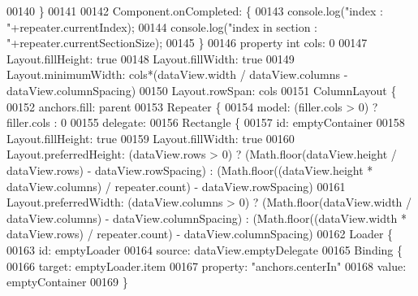 \begin{DoxyCode}
{00140 \textcolor{comment}{                \}}
00141 \textcolor{comment}{}
00142 \textcolor{comment}{                Component.onCompleted: \{}
00143 \textcolor{comment}{                    console.log("index : "+repeater.currentIndex);}
00144 \textcolor{comment}{                    console.log("index in section : "+repeater.currentSectionSize);}
00145 \textcolor{comment}{                \}}
00146 \textcolor{comment}{                property int cols: 0}
00147 \textcolor{comment}{                Layout.fillHeight: true}
00148 \textcolor{comment}{                Layout.fillWidth: true}
00149 \textcolor{comment}{                Layout.minimumWidth: cols*(dataView.width / dataView.columns  - dataView.columnSpacing)}
00150 \textcolor{comment}{                Layout.rowSpan: cols}
00151 \textcolor{comment}{                ColumnLayout \{}
00152 \textcolor{comment}{                    anchors.fill: parent}
00153 \textcolor{comment}{                    Repeater \{}
00154 \textcolor{comment}{                        model: (filler.cols > 0) ? filler.cols : 0}
00155 \textcolor{comment}{                        delegate:}
00156 \textcolor{comment}{                            Rectangle \{}
00157 \textcolor{comment}{                            id: emptyContainer}
00158 \textcolor{comment}{                            Layout.fillHeight: true}
00159 \textcolor{comment}{                            Layout.fillWidth: true}
00160 \textcolor{comment}{                            Layout.preferredHeight: (dataView.rows > 0) ? (Math.floor(dataView.height /
       dataView.rows) - dataView.rowSpacing) : (Math.floor((dataView.height * dataView.columns) / repeater.count) -
       dataView.rowSpacing)}
00161 \textcolor{comment}{                            Layout.preferredWidth: (dataView.columns > 0) ? (Math.floor(dataView.width /
       dataView.columns) - dataView.columnSpacing) : (Math.floor((dataView.width * dataView.rows) / repeater.count) -
       dataView.columnSpacing)}
00162 \textcolor{comment}{                            Loader \{}
00163 \textcolor{comment}{                                id: emptyLoader}
00164 \textcolor{comment}{                                source: dataView.emptyDelegate}
00165 \textcolor{comment}{                                Binding \{}
00166 \textcolor{comment}{                                    target: emptyLoader.item}
00167 \textcolor{comment}{                                    property: "anchors.centerIn"}
00168 \textcolor{comment}{                                    value: emptyContainer}
00169 \textcolor{comment}{                                \}}
}
\end{DoxyCode}
